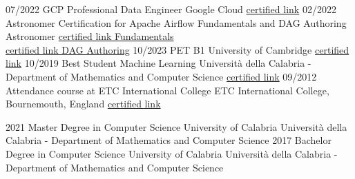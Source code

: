 \documentclass[9pt]{developercv} %
\begin{document}

    \vspace{-10 pt}
    \begin{entrylist}
        \entry
        {07/2022}
        {GCP Professional Data Engineer }
        {Google Cloud}
        {\href{https://www.credential.net/470d1fe8-1a20-41af-961f-096835a17255}{certified link}}
        \entry
        {02/2022}
        {Astronomer Certification for Apache Airflow Fundamentals and DAG Authoring}
        {Astronomer}
        {\href{https://www.credly.com/badges/f424a105-4f82-4de6-91bf-70a299052e09/public_url}{certified link Fundamentals}\\
        \href{https://www.credly.com/badges/1f1da504-b57b-48d7-8072-fef4f4986b63/public_url}{certified link DAG Authoring}}
        \entry
        {10/2023}
        {PET B1}
        {University of Cambridge}
        {{\href{https://drive.google.com/file/d/1ovX9Wdp6UM7LHn44SEOdAeHrJC6N86qy/view?usp=sharing}{certified link}}}
        \entry
        {10/2019}
        {Best Student Machine Learning}
        {Università della Calabria - Department of Mathematics and Computer Science}
        {{\href{https://drive.google.com/file/d/1cmzZnOyi90RKBXiMnFjD5uF40IebOAa0/view?usp=sharing}{certified link}}}
        \entry
        {09/2012}
        {Attendance course at ETC International College}
        {ETC International College, Bournemouth, England}
        {{\href{https://drive.google.com/file/d/1Ai58gPiwgB0o7BCikFwToqYFdmYi5bV2/view?usp=sharing}{certified link}}}
    \end{entrylist}
    \vspace{-10 pt}
    \begin{entrylist}
        \entry
        {2021}
        {Master Degree in Computer Science}
        {University of Calabria}
        {Università della Calabria - Department of Mathematics and Computer Science}
        \entry
        {2017}
        {Bachelor Degree in Computer Science}
        {University of Calabria}
        {Università della Calabria - Department of Mathematics and Computer Science}
    \end{entrylist}
\end{document}
